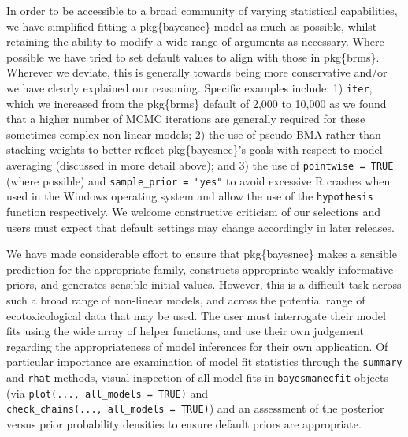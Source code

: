 \documentclass[
]{jss}
\begin{document}
In order to be accessible to a broad community of varying statistical
capabilities, we have simplified fitting a pkg\{bayesnec\} model as much
as possible, whilst retaining the ability to modify a wide range of
arguments as necessary. Where possible we have tried to set default
values to align with those in pkg\{brms\}. Wherever we deviate, this is
generally towards being more conservative and/or we have clearly
explained our reasoning. Specific examples include: 1) \texttt{iter},
which we increased from the pkg\{brms\} default of 2,000 to 10,000 as we
found that a higher number of MCMC iterations are generally required for
these sometimes complex non-linear models; 2) the use of pseudo-BMA
rather than stacking weights to better reflect pkg\{bayesnec\}'s goals
with respect to model averaging (discussed in more detail above); and 3)
the use of \texttt{pointwise\ =\ TRUE} (where possible) and
\texttt{sample\_prior\ =\ "yes"} to avoid excessive R crashes when used
in the Windows operating system and allow the use of the
\texttt{hypothesis} function respectively. We welcome constructive
criticism of our selections and users must expect that default settings
may change accordingly in later releases.

We have made considerable effort to ensure that pkg\{bayesnec\} makes a
sensible prediction for the appropriate family, constructs appropriate
weakly informative priors, and generates sensible initial values.
However, this is a difficult task across such a broad range of
non-linear models, and across the potential range of ecotoxicological
data that may be used. The user must interrogate their model fits using
the wide array of helper functions, and use their own judgement
regarding the appropriateness of model inferences for their own
application. Of particular importance are examination of model fit
statistics through the \texttt{summary} and \texttt{rhat} methods,
visual inspection of all model fits in \texttt{bayesmanecfit} objects
(via \texttt{plot(...,\ all\_models\ =\ TRUE)} and
\texttt{check\_chains(...,\ all\_models\ =\ TRUE)}) and an assessment of
the posterior versus prior probability densities to ensure default
priors are appropriate.
\end{document}
